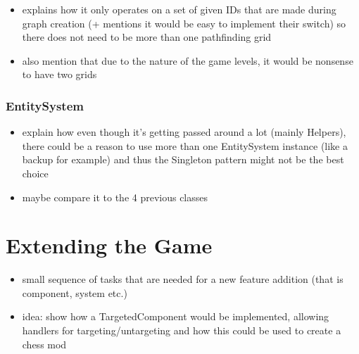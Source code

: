 \begin{itemize}
    \item explains how it only operates on a set of given IDs that are
        made during graph creation (+ mentions it would be easy to implement
        their switch) so there does not need to be more than one pathfinding grid
    \item also mention that due to the nature of the game levels, it would be nonsense
        to have two grids
\end{itemize}

\subsubsection{EntitySystem}

\begin{itemize}
    \item explain how even though it's getting passed around a lot (mainly Helpers),
        there could be a reason to use more than one EntitySystem instance (like a backup
        for example) and thus the Singleton pattern might not be the best choice
    \item maybe compare it to the 4 previous classes
\end{itemize}

\section{Extending the Game}

\begin{itemize}
    \item small sequence of tasks that are needed for a new feature addition
        (that is component, system etc.)
    \item idea: show how a TargetedComponent would be implemented, allowing
        handlers for targeting/untargeting and how this could be used to create
        a chess mod
\end{itemize}
